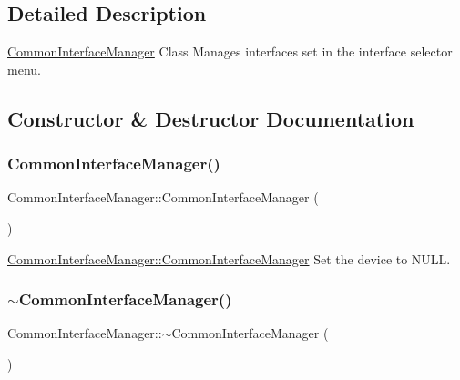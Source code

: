 \subsection{Detailed Description}
\hyperlink{class_common_interface_manager}{Common\+Interface\+Manager} Class Manages interfaces set in the interface selector menu. 

\subsection{Constructor \& Destructor Documentation}
\hypertarget{class_common_interface_manager_a3f970287bd77d17ea41a6795b25ce7e3}{}\label{class_common_interface_manager_a3f970287bd77d17ea41a6795b25ce7e3} 
\subsubsection{\texorpdfstring{Common\+Interface\+Manager()}{CommonInterfaceManager()}}
{\footnotesize\ttfamily Common\+Interface\+Manager\+::\+Common\+Interface\+Manager (\begin{DoxyParamCaption}{ }\end{DoxyParamCaption})}



\hyperlink{class_common_interface_manager_a3f970287bd77d17ea41a6795b25ce7e3}{Common\+Interface\+Manager\+::\+Common\+Interface\+Manager} Set the device to N\+U\+LL. 

\hypertarget{class_common_interface_manager_ad92cabe2e4f39fd762cf621df5125fa1}{}\label{class_common_interface_manager_ad92cabe2e4f39fd762cf621df5125fa1} 
\subsubsection{\texorpdfstring{$\sim$\+Common\+Interface\+Manager()}{~CommonInterfaceManager()}}
{\footnotesize\ttfamily Common\+Interface\+Manager\+::$\sim$\+Common\+Interface\+Manager (\begin{DoxyParamCaption}{ }\end{DoxyParamCaption})}



